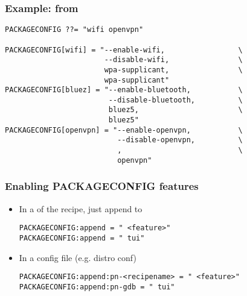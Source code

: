\begin{frame}[fragile]
  \frametitle{Example: from }
  \begin{block}{}
  \begin{verbatim}
PACKAGECONFIG ??= "wifi openvpn"

PACKAGECONFIG[wifi] = "--enable-wifi,                 \
                       --disable-wifi,                \
                       wpa-supplicant,                \
                       wpa-supplicant"
PACKAGECONFIG[bluez] = "--enable-bluetooth,           \
                        --disable-bluetooth,          \
                        bluez5,                       \
                        bluez5"
PACKAGECONFIG[openvpn] = "--enable-openvpn,           \
                          --disable-openvpn,          \
                          ,                           \
                          openvpn"
  \end{verbatim}
  \end{block}
\end{frame}

\begin{frame}[fragile]
  \frametitle{Enabling PACKAGECONFIG features}
  \begin{itemize}
    \item In a \code{.bbappend} of the recipe, just append to 
      \begin{block}{}
        \begin{verbatim}
PACKAGECONFIG:append = " <feature>"
PACKAGECONFIG:append = " tui"
        \end{verbatim}
      \end{block}

    \item In a config file (e.g. distro conf)
      \begin{block}{}
        \begin{verbatim}
PACKAGECONFIG:append:pn-<recipename> = " <feature>"
PACKAGECONFIG:append:pn-gdb = " tui"
        \end{verbatim}
      \end{block}
  \end{itemize}
\end{frame}


